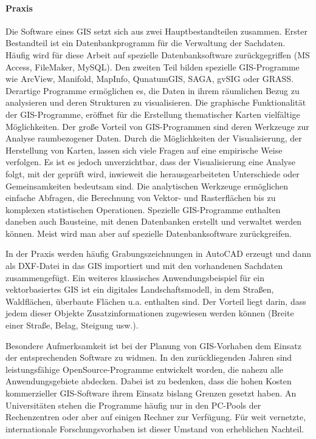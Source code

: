 \paragraph{Praxis}
Die Software eines GIS setzt sich aus zwei Hauptbestandteilen zusammen.  Erster Bestandteil ist ein Datenbankprogramm für die Verwaltung der Sachdaten. Häufig wird für diese Arbeit auf spezielle Datenbanksoftware zurückgegriffen (MS Access, FileMaker, MySQL). Den zweiten Teil bilden spezielle GIS-Programme wie ArcView, Manifold, MapInfo, QunatumGIS, SAGA, gvSIG oder GRASS. Derartige Programme ermöglichen es, die Daten in ihrem räumlichen Bezug zu analysieren und deren Strukturen zu visualisieren. Die graphische Funktionalität der GIS-Programme, eröffnet für die Erstellung thematischer Karten vielfältige Möglichkeiten. Der große Vorteil von GIS-Programmen sind deren Werkzeuge zur Analyse raumbezogener Daten. Durch die Möglichkeiten der Visualisierung, der Herstellung von Karten, lassen sich viele Fragen auf eine empirische Weise verfolgen. Es  ist es jedoch unverzichtbar, dass der Visualisierung eine Analyse folgt, mit der geprüft wird, inwieweit die herausgearbeiteten Unterschiede oder Gemeinsamkeiten bedeutsam sind. Die analytischen  Werkzeuge ermöglichen einfache Abfragen, die Berechnung von Vektor- und Rasterflächen bis zu komplexen statistischen Operationen. Spezielle GIS-Programme enthalten daneben auch Bausteine, mit denen Datenbanken erstellt und verwaltet werden können. Meist wird man aber auf spezielle Datenbanksoftware zurückgreifen. 

In der Praxis werden häufig Grabungszeichnungen in AutoCAD erzeugt und dann  als DXF-Datei in das GIS importiert und mit den vorhandenen Sachdaten zusammengefügt. Ein weiteres klassisches Anwendungsbeispiel für ein vektorbasiertes GIS ist ein digitales Landschaftsmodell, in dem Straßen, Waldflächen, überbaute Flächen u.a. enthalten sind.  Der Vorteil liegt darin, dass jedem dieser Objekte Zusatzinformationen zugewiesen werden können (Breite einer Straße, Belag, Steigung usw.).

Besondere Aufmerksamkeit ist bei der Planung von GIS-Vorhaben dem Einsatz der entsprechenden Software zu widmen. In den zurückliegenden Jahren sind leistungsfähige OpenSource-Programme entwickelt worden, die nahezu alle Anwendungsgebiete abdecken. Dabei ist zu bedenken, dass die hohen Kosten kommerzieller GIS-Software ihrem Einsatz bislang Grenzen gesetzt haben. An Universitäten stehen die Programme häufig nur in den PC-Pools der Rechenzentren oder aber auf einigen Rechner zur Verfügung. Für weit vernetzte, internationale Forschungsvorhaben ist dieser Umstand von erheblichen Nachteil. 

